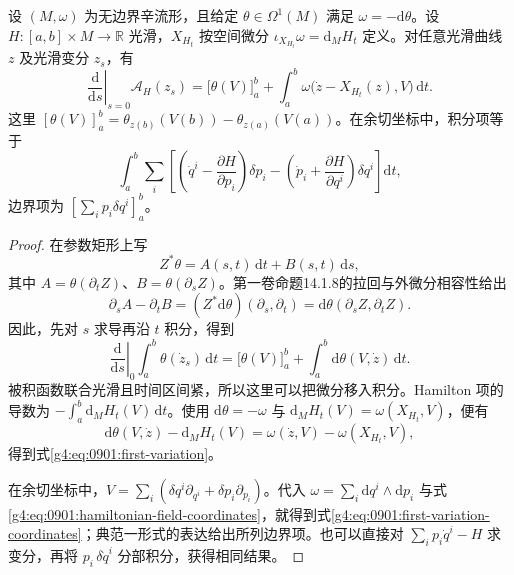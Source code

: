 \begin{theorem}\label{g4:thm:0901:first-variation}
	设 \((M,\omega)\) 为无边界辛流形，且给定 \(\theta\in\Omega^1(M)\) 满足 \(\omega=-\mathrm{d}\theta\)。设 \(H:[a,b]\times M\to\mathbb R\) 光滑，\(X_{H_t}\) 按空间微分 \(\iota_{X_{H_t}}\omega=\mathrm{d}_M H_t\) 定义。对任意光滑曲线 \(z\) 及光滑变分 \(z_s\)，有
	\begin{equation}\label{g4:eq:0901:first-variation}
		\left.\frac{\mathrm{d}}{\mathrm{d}s}\right|_{s=0}\mathcal A_H(z_s)
		=\bigl[\theta(V)\bigr]_a^b
		+\int_a^b\omega\bigl(\dot z-X_{H_t}(z),V\bigr)\,\mathrm{d}t.
	\end{equation}
	这里 \([\theta(V)]_a^b=\theta_{z(b)}(V(b))-\theta_{z(a)}(V(a))\)。在余切坐标中，积分项等于
	\begin{equation}\label{g4:eq:0901:first-variation-coordinates}
		\int_a^b\sum_i\left[
		\left(\dot q^i-\frac{\partial H}{\partial p_i}\right)\delta p_i
		-\left(\dot p_i+\frac{\partial H}{\partial q^i}\right)\delta q^i
		\right]\mathrm{d}t,
	\end{equation}
	边界项为 \([\sum_i p_i\delta q^i]_a^b\)。
\end{theorem}
\begin{proof}
	在参数矩形上写
	\[
		Z^*\theta=A(s,t)\,\mathrm{d}t+B(s,t)\,\mathrm{d}s,
	\]
	其中 \(A=\theta(\partial_tZ)\)、\(B=\theta(\partial_sZ)\)。第一卷命题14.1.8的拉回与外微分相容性给出
	\[
		\partial_sA-\partial_tB
		=(Z^*\mathrm{d}\theta)(\partial_s,\partial_t)
		=\mathrm{d}\theta(\partial_sZ,\partial_tZ).
	\]
	因此，先对 \(s\) 求导再沿 \(t\) 积分，得到
	\[
		\left.\frac{\mathrm{d}}{\mathrm{d}s}\right|_0
		\int_a^b\theta(\dot z_s)\,\mathrm{d}t
		=\bigl[\theta(V)\bigr]_a^b
		+\int_a^b\mathrm{d}\theta(V,\dot z)\,\mathrm{d}t.
	\]
	被积函数联合光滑且时间区间紧，所以这里可以把微分移入积分。Hamilton 项的导数为 \(-\int_a^b\mathrm{d}_M H_t(V)\,\mathrm{d}t\)。使用 \(\mathrm{d}\theta=-\omega\) 与 \(\mathrm{d}_M H_t(V)=\omega(X_{H_t},V)\)，便有
	\[
		\mathrm{d}\theta(V,\dot z)-\mathrm{d}_M H_t(V)
		=\omega(\dot z,V)-\omega(X_{H_t},V),
	\]
	得到式\eqref{g4:eq:0901:first-variation}。

	在余切坐标中，\(V=\sum_i(\delta q^i\partial_{q^i}+\delta p_i\partial_{p_i})\)。代入 \(\omega=\sum_i\mathrm{d}q^i\wedge\mathrm{d}p_i\) 与式\eqref{g4:eq:0901:hamiltonian-field-coordinates}，就得到式\eqref{g4:eq:0901:first-variation-coordinates}；典范一形式的表达给出所列边界项。也可以直接对 \(\sum_i p_i\dot q^i-H\) 求变分，再将 \(p_i\,\delta\dot q^i\) 分部积分，获得相同结果。
\end{proof}

